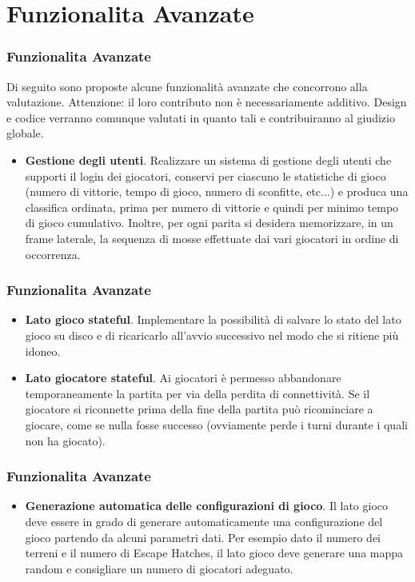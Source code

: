 \documentclass{beamer}
\begin{document}
\section{Funzionalita Avanzate}
\begin{frame}
\frametitle{Funzionalita Avanzate}

Di seguito sono proposte alcune funzionalit\`a avanzate che concorrono alla valutazione.  Attenzione: il loro contributo non \`e  necessariamente additivo. Design e codice verranno comunque valutati in quanto tali e contribuiranno al giudizio globale.

\begin{itemize}
\item \textbf{Gestione degli utenti}. Realizzare un sistema di
  gestione degli utenti che supporti il login dei giocatori, conservi
  per ciascuno le statistiche di gioco (numero di vittorie, tempo di
  gioco, numero di sconfitte, etc...) e produca una classifica
  ordinata, prima per numero di vittorie e quindi per minimo tempo di
  gioco cumulativo. Inoltre, per ogni parita si desidera
  memorizzare, in un frame laterale, la sequenza di mosse effettuate dai
  vari giocatori in ordine di occorrenza.
\end{itemize}
\end{frame}

\begin{frame}
\frametitle{Funzionalita Avanzate}
\begin{itemize}
\item  \textbf{Lato gioco stateful}. Implementare la possibilit\`a di
  salvare lo stato del lato gioco su disco e di ricaricarlo all'avvio
  successivo nel modo che si ritiene pi\`u idoneo. 
\item  \textbf{Lato giocatore stateful}. Ai giocatori \`e permesso abbandonare
  temporaneamente la partita per via della perdita di connettivit\`a.
  Se il giocatore si riconnette prima della fine della partita pu\`o
  ricominciare a giocare, come se nulla fosse successo (ovviamente
  perde i turni durante i quali non ha giocato).
\end{itemize}

\end{frame}

\begin{frame}
\frametitle{Funzionalita Avanzate}
\begin{itemize}
\item \textbf{Generazione automatica delle configurazioni di
    gioco}. Il lato gioco deve essere in grado di generare automaticamente
  una configurazione del gioco partendo da alcuni parametri dati. Per
  esempio dato il numero dei terreni e il numero di Escape Hatches, il
  lato gioco deve generare una mappa random e consigliare un numero di
  giocatori adeguato.
\end{itemize}

\end{frame}
\end{document}
